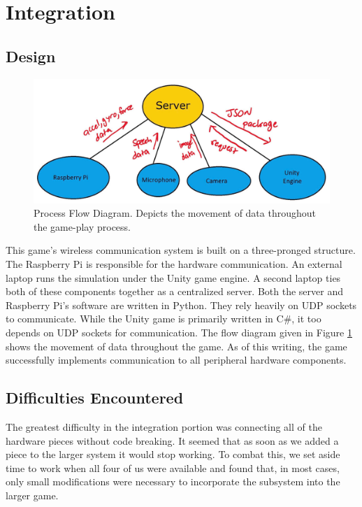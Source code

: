 \documentclass[titlepage, 12pt]{scrartcl}
\begin{document}
\section{Integration}
    \subsection{Design}
        \begin{figure}
        \centering
        \includegraphics[scale=0.2]{figures/flow_chart.jpg}
        \caption{Process Flow Diagram. Depicts the movement of data throughout the game-play process.}
        \label{fig:flow_chart}
    \end{figure}
        This game's wireless communication system is built on a three-pronged structure. The Raspberry Pi is responsible for the hardware communication. An external laptop runs the simulation under the Unity game engine. A second laptop ties both of these components together as a centralized server.
        Both the server and Raspberry Pi's software are written in Python. They rely heavily on UDP sockets to communicate. While the Unity game is primarily written in C\#, it too depends on UDP sockets for communication. The flow diagram given in Figure \ref{fig:flow_chart} shows the movement of data throughout the game. As of this writing, the game successfully implements communication to all peripheral hardware components.
    \subsection{Difficulties Encountered}
        The greatest difficulty in the integration portion was connecting all of the hardware pieces without code breaking. It seemed that as soon as we added a piece to the larger system it would stop working. To combat this, we set aside time to work when all four of us were available and found that, in most cases, only small modifications were necessary to incorporate the subsystem into the larger game.
\end{document}
